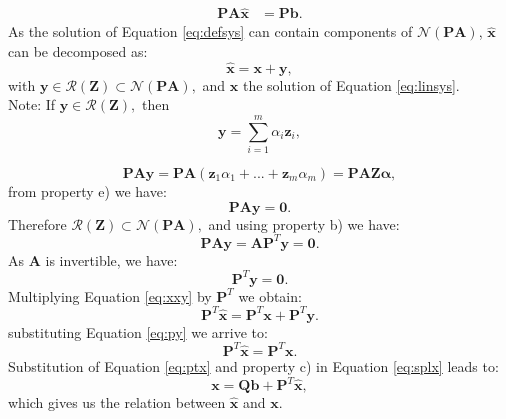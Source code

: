 \documentclass[12pt]{article}
\begin{document}
{\begin{align}\label{eq:defsys}
\mathbf{P}\mathbf{A}\hat{\mathbf{x}}&=\mathbf{P}\mathbf{b}.
\end{align}
As the solution of Equation \eqref{eq:defsys} can contain components of 
$\mathcal{N}(\mathbf{P}\mathbf{A})$,
$\mathbf{\hat{x}}$ can be decomposed as:
\begin{equation}\label{eq:xxy}
\mathbf{\hat{x}}=\mathbf{x}+ \mathbf{y},
\end{equation}
with $\mathbf{y} \in \mathcal{R}(\mathbf{Z})\subset \mathcal{N}(\mathbf{P}\mathbf{A}),$ 
and $\mathbf{x}$ the solution of Equation \eqref{eq:linsys}.\\
Note: If $\mathbf{y} \in \mathcal{R}(\mathbf{Z}),$ then $$\mathbf{y}=\sum^{m}_{i=1}\alpha_i \mathbf{z}_i,$$\par
 \begin{equation*}\label{eq:paz}
 \mathbf{P}\mathbf{A}\mathbf{y} =\mathbf{P}\mathbf{A}(\mathbf{z}_1\alpha_1 +...+ \mathbf{z}_m\alpha_m)=\mathbf{P}\mathbf{A}\mathbf{Z}\mathbf{\alpha},\end{equation*}
 from property e) we have:
 \begin{equation*}\label{eq:pay}
 \mathbf{P}\mathbf{A}\mathbf{y}=\mathbf{0}.
 \end{equation*}
Therefore $\mathcal{R}(\mathbf{Z})\subset \mathcal{N}(\mathbf{P}\mathbf{A}),$ and using property b) we have:
 \begin{equation*}
 \mathbf{P}\mathbf{A}\mathbf{y}=\mathbf{A}\mathbf{P}^T\mathbf{y}=\mathbf{0}.
 \end{equation*}
 As $\mathbf{A}$ is invertible, we have:
  \begin{equation}\label{eq:py}
\mathbf{P}^T\mathbf{y}=\mathbf{0}.
 \end{equation}
 Multiplying Equation \eqref{eq:xxy} by $\mathbf{P}^T$ we obtain:
$$\mathbf{P}^T\mathbf{\hat{x}}=\mathbf{P}^T\mathbf{x}+\mathbf{P}^T\mathbf{y}.$$
substituting Equation \eqref{eq:py} we arrive to:
  \begin{equation}\label{eq:ptx}
\mathbf{P}^T\mathbf{\hat{x}}=\mathbf{P}^T\mathbf{x}.
 \end{equation}
Substitution of Equation \eqref{eq:ptx} and property c) in Equation \eqref{eq:splx} leads to:
\begin{equation}\label{eq:xfromxh1}
    \mathbf{x}=\mathbf{Q}\mathbf{b}+\mathbf{P}^T\mathbf{\hat{x}}, 
\end{equation}
which gives us the relation between $\mathbf{\hat{x}}$ and $\mathbf{x}$.

}
\end{document}
